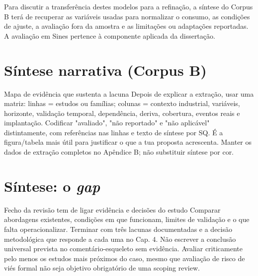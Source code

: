 Para discutir a transferência destes modelos para a refinação, a
síntese do Corpus B terá de recuperar as variáveis usadas para
normalizar o consumo, as condições de ajuste, a avaliação fora da
amostra e as limitações ou adaptações reportadas. A avaliação em
Sines pertence à componente aplicada da dissertação.


\section{Síntese narrativa (Corpus B)}
\label{sec:corpus-b}
{Mapa de evidência que sustenta a lacuna}
{Depois de explicar a extração, usar uma matriz: linhas = estudos ou
famílias; colunas = contexto industrial, variáveis, horizonte, validação
temporal, dependência, deriva, cobertura, eventos reais e implantação.
Codificar "avaliado", "não reportado" e "não aplicável" distintamente,
com referências nas linhas e texto de síntese por SQ. É a figura/tabela
mais útil para justificar o que a tua proposta acrescenta. Manter os
dados de extração completos no Apêndice B; não substituir síntese por cor.}%



\section{Síntese: o \emph{gap}}
\label{sec:gap}
{Fecho da revisão tem de ligar evidência e decisões do estudo}
{Comparar abordagens existentes, condições em que funcionam, limites de
validação e o que falta operacionalizar. Terminar com três lacunas
documentadas e a decisão metodológica que responde a cada uma no Cap. 4.
Não escrever a conclusão universal prevista no comentário-esqueleto sem
evidência. Avaliar criticamente pelo menos os estudos mais próximos do
caso, mesmo que avaliação de risco de viés formal não seja objetivo
obrigatório de uma scoping review.}%


